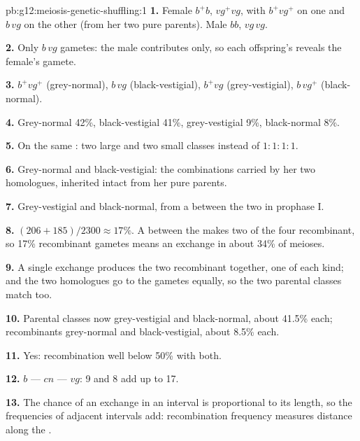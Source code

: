 \begin{solution}{pb:g12:meiosis-genetic-shuffling:1}
\textbf{1.} Female $b^+b$, $vg^+vg$, with $b^+vg^+$ on one 
and $b\,vg$ on the other (from her two pure parents). Male $bb$,
$vg\,vg$.

\textbf{2.} Only $b\,vg$ gametes: the male contributes 
 only, so each offspring's  reveals the female's
gamete.

\textbf{3.} $b^+vg^+$ (grey-normal), $b\,vg$ (black-vestigial),
$b^+vg$ (grey-vestigial), $b\,vg^+$ (black-normal).

\textbf{4.} Grey-normal 42\%, black-vestigial 41\%, grey-vestigial 9\%,
black-normal 8\%.

\textbf{5.} On the same : two large and two small classes
instead of $1:1:1:1$.

\textbf{6.} Grey-normal and black-vestigial: the combinations carried
by her two homologues, inherited intact from her pure parents.

\textbf{7.} Grey-vestigial and black-normal, from a 
between the two  in prophase I.

\textbf{8.} $(206 + 185)/2300 \approx 17\%$. A  between
the  makes two of the four  recombinant, so 17\%
recombinant gametes means an exchange in about 34\% of meioses.

\textbf{9.} A single exchange produces the two recombinant 
together, one of each kind; and the two homologues go to the gametes
equally, so the two parental classes match too.

\textbf{10.} Parental classes now grey-vestigial and black-normal,
about 41.5\% each; recombinants grey-normal and black-vestigial, about
8.5\% each.

\textbf{11.} Yes: recombination well below 50\% with both.

\textbf{12.} $b$ --- $cn$ --- $vg$: 9 and 8 add up to 17.

\textbf{13.} The chance of an exchange in an interval is proportional
to its length, so the frequencies of adjacent intervals add:
recombination frequency measures distance along the .


\end{solution}
